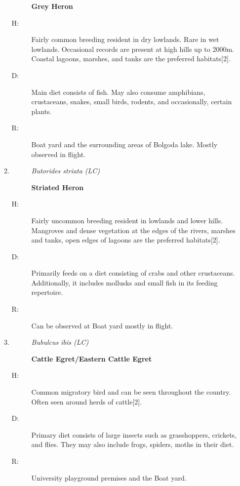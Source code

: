 \begin{itemize}
\begin{enumerate}
\begin{description}
\textbf{Grey Heron}%
\end{description}%
\begin{description}%
\item[H: ]%
Fairly common breeding resident in dry lowlands. Rare in wet lowlands. Occasional records are present at high hills up to 2000m. Coastal lagoons, marshes, and tanks are the preferred habitats{[}2{]}.%
\item[D: ]%
Main diet consists of fish. May also consume amphibians, crustaceans, snakes, small birds, rodents, and occasionally, certain plants.%
\item[R: ]%
Boat yard and the surrounding areas of Bolgoda lake. Mostly observed in flight.%
\end{description}%
\item%
\begin{description}%
\item[]%
\textit{Butorides striata (LC)}%
\item[]%
\textbf{Striated Heron}%
\end{description}%
\begin{description}%
\item[H: ]%
Fairly uncommon breeding resident in lowlands and lower hills. Mangroves and dense vegetation at the edges of the rivers, marshes and tanks, open edges of lagoons are the preferred habitats{[}2{]}.%
\item[D: ]%
Primarily feeds on a diet consisting of crabs and other crustaceans. Additionally, it includes mollusks and small fish in its feeding repertoire.%
\item[R: ]%
Can be observed at Boat yard mostly in flight.%
\end{description}%
\item%
\begin{description}%
\item[]%
\textit{Bubulcus ibis (LC)}%
\item[]%
\textbf{Cattle Egret/Eastern Cattle Egret}%
\end{description}%
\begin{description}%
\item[H: ]%
Common migratory bird and can be seen throughout the country. Often seen around herds of cattle{[}2{]}.%
\item[D: ]%
Primary diet consists of large insects such as grasshoppers, crickets, and flies. They may also include frogs, spiders, moths in their diet.%
\item[R: ]%
University playground premises and the Boat yard.%

\end{description}
\end{enumerate}
\end{itemize}
